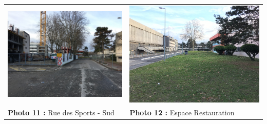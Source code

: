 \documentclass[hidelinks, paper=a4, fontsize=13pt]{report}
\begin{document}
\begin{center}
\begin{tabular}{ll}
\includegraphics[width=.45\textwidth]{Annexes/Exports/Photo_11} & \includegraphics[width=.45\textwidth]{Annexes/Exports/Photo_12} \\
\textbf{Photo 11 :} Rue des Sports - Sud & \textbf{Photo 12 :} Espace Restauration\\
\end{tabular}
\end{center}

\newpage
\end{document}
